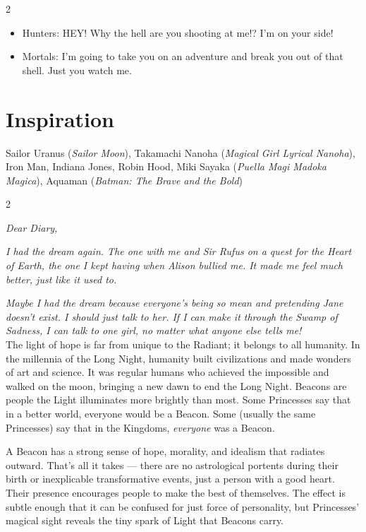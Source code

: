 \begin{multicols}{2}
\begin{itemize}
\item Hunters: HEY! Why the hell are you shooting at me!? I'm on your side!
\item Mortals: I'm going to take you on an adventure and break you out of that shell. Just you watch me. 
\end{itemize}

\section*{Inspiration}
Sailor Uranus (\textit{Sailor Moon}), Takamachi Nanoha (\textit{Magical Girl Lyrical Nanoha}), Iron Man, Indiana Jones, Robin Hood, Miki Sayaka (\textit{Puella Magi Madoka Magica}), Aquaman (\textit{Batman: The Brave and the Bold})

\end{multicols}\label{scha:Beacons}\begin{multicols}{2}\raggedcolumns

\noindent \textit{Dear Diary,}

\textit{I had the dream again. The one with me and Sir Rufus on a quest for the Heart of Earth, the one I kept having when Alison bullied me. It made me feel much better, just like it used to.}

\textit{Maybe I had the dream because everyone's being so mean and pretending Jane doesn't exist. I should just talk to her. If I can make it through the Swamp of Sadness, I can talk to one girl, no matter what anyone else tells me!}\\

\noindent The light of hope is far from unique to the Radiant; it belongs to all humanity. In the millennia of the Long Night, humanity built civilizations and made wonders of art and science. It was regular humans who achieved the impossible and walked on the moon, bringing a new dawn to end the Long Night. Beacons are people the Light illuminates more brightly than most. Some Princesses say that in a better world, everyone would be a Beacon. Some (usually the same Princesses) say that in the Kingdoms, \textit{everyone} was a Beacon.

A Beacon has a strong sense of hope, morality, and idealism that radiates outward. That’s all it takes — there are no astrological portents during their birth or inexplicable transformative events, just a person with a good heart. Their presence encourages people to make the best of themselves. The effect is subtle enough that it can be confused for just force of personality, but Princesses' magical sight reveals the tiny spark of Light that Beacons carry. 


\end{multicols}
